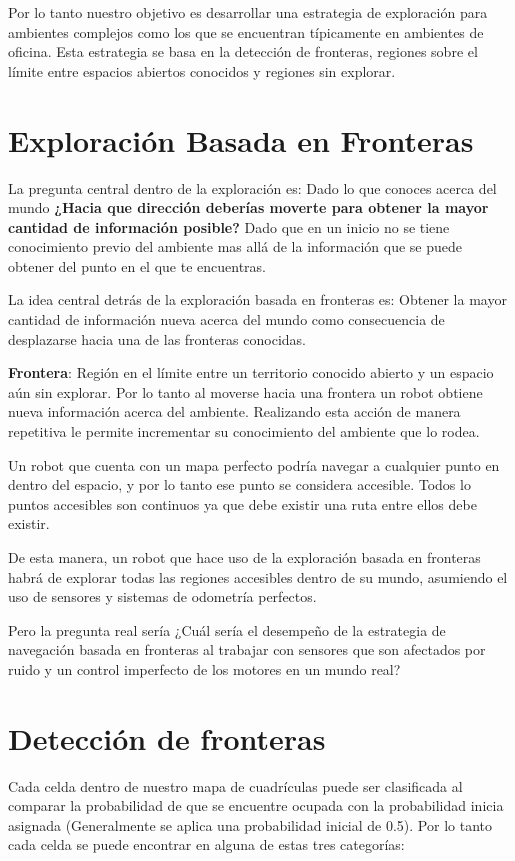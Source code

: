 \documentclass[12pt]{article}
\begin{document}
Por lo tanto nuestro objetivo es desarrollar una estrategia de exploración para ambientes complejos como los que se encuentran típicamente en ambientes de oficina. Esta estrategia se basa en la detección de fronteras, regiones sobre el límite entre espacios abiertos conocidos y regiones sin explorar.

\section{Exploración Basada en Fronteras}

La pregunta central dentro de la exploración es: Dado lo que conoces acerca del mundo \textbf{¿Hacia que dirección deberías moverte para obtener la mayor cantidad de información posible?} Dado que en un inicio no se tiene conocimiento previo del ambiente mas allá de la información que se puede obtener del punto en el que te encuentras.

La idea central detrás de la exploración basada en fronteras es: Obtener la mayor cantidad de información nueva acerca del mundo como consecuencia de desplazarse hacia una de las fronteras conocidas.

\textbf{Frontera}: Región en el límite entre un territorio conocido abierto y un espacio aún sin explorar. Por lo tanto al moverse hacia una frontera un robot obtiene nueva información acerca del ambiente. Realizando esta acción de manera repetitiva le permite incrementar su conocimiento del ambiente que lo rodea.

Un robot que cuenta con un mapa perfecto podría navegar a cualquier punto en dentro del espacio, y por lo tanto ese punto se considera accesible. Todos lo puntos accesibles son continuos ya que debe existir una ruta entre ellos debe existir. 

De esta manera, un robot que hace uso de la exploración basada en fronteras habrá de explorar todas las regiones accesibles dentro de su mundo, asumiendo el uso de sensores y sistemas de odometría perfectos.

Pero la pregunta real sería ¿Cuál sería el desempeño de la estrategia de navegación basada en fronteras al trabajar con sensores que son afectados por ruido y un control imperfecto de los motores en un mundo real?

\section{Detección de fronteras}

Cada celda dentro de nuestro mapa de cuadrículas puede ser clasificada al comparar la probabilidad de que se encuentre ocupada con la probabilidad inicia asignada (Generalmente se aplica una probabilidad inicial de 0.5). Por lo tanto cada celda se puede encontrar en alguna de estas tres categorías:
\end{document}
